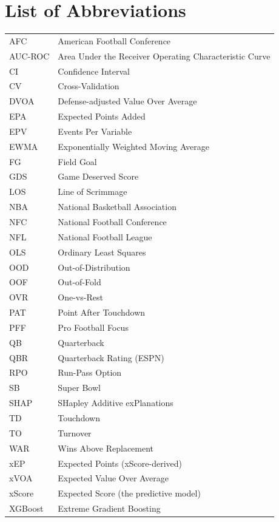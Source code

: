 \chapter*{List of Abbreviations}

\begin{tabular}{@{}ll@{}}
  AFC     & American Football Conference \\
  AUC-ROC & Area Under the Receiver Operating Characteristic Curve \\
  CI      & Confidence Interval \\
  CV      & Cross-Validation \\
  DVOA    & Defense-adjusted Value Over Average \\
  EPA     & Expected Points Added \\
  EPV     & Events Per Variable \\
  EWMA    & Exponentially Weighted Moving Average \\
  FG      & Field Goal \\
  GDS     & Game Deserved Score \\
  LOS     & Line of Scrimmage \\
  NBA     & National Basketball Association \\
  NFC     & National Football Conference \\
  NFL     & National Football League \\
  OLS     & Ordinary Least Squares \\
  OOD     & Out-of-Distribution \\
  OOF     & Out-of-Fold \\
  OVR     & One-vs-Rest \\
  PAT     & Point After Touchdown \\
  PFF     & Pro Football Focus \\
  QB      & Quarterback \\
  QBR     & Quarterback Rating (ESPN) \\
  RPO     & Run-Pass Option \\
  SB      & Super Bowl \\
  SHAP    & SHapley Additive exPlanations \\
  TD      & Touchdown \\
  TO      & Turnover \\
  WAR     & Wins Above Replacement \\
  xEP     & Expected Points (xScore-derived) \\
  xVOA    & Expected Value Over Average \\
  xScore  & Expected Score (the predictive model) \\
  XGBoost & Extreme Gradient Boosting \\
\end{tabular}
